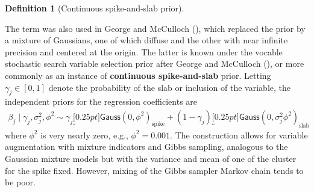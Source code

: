 \documentclass[
  11pt,
  letterpaper,
]{scrbook}
\theoremstyle{definition}
\theoremstyle{plain}
\theoremstyle{plain}
\theoremstyle{plain}
\theoremstyle{definition}
\theoremstyle{definition}
\newtheorem{definition}{Definition}[chapter]
\theoremstyle{plain}
\theoremstyle{plain}
\theoremstyle{remark}
\begin{document}
\begin{definition}[Continuous spike-and-slab
prior]\protect\hypertarget{def-cont-spike-slab}{}\label{def-cont-spike-slab}

The term was also used in George and McCulloch
(), which replaced the prior
by a mixture of Gaussians, one of which diffuse and the other with near
infinite precision and centered at the origin. The latter is known under
the vocable stochastic search variable selection prior after George and
McCulloch (), or more commonly
as an instance of \textbf{continuous spike-and-slab} prior. Letting
\(\gamma_j \in [0,1]\) denote the probability of the slab or inclusion
of the variable, the independent priors for the regression coefficients
are \begin{align*}
 \beta_j \mid \gamma_j, \sigma_j^2, \phi^2 \sim  \gamma_j \underbracket[0.25pt]{\mathsf{Gauss}(0, \phi^2)}_{\text{spike}} + (1-\gamma_j) \underbracket[0.25pt]{\mathsf{Gauss}(0, \sigma_j^2\phi^2)}_{\text{slab}}
\end{align*} where \(\phi^2\) is very nearly zero, e.g.,
\(\phi^2=0.001.\) The construction allows for variable augmentation with
mixture indicators and Gibbs sampling, analogous to the Gaussian mixture
models but with the variance and mean of one of the cluster for the
spike fixed. However, mixing of the Gibbs sampler Markov chain tends to
be poor.

\end{definition}
\end{document}
